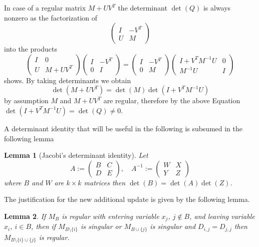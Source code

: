 \documentclass[a4paper]{article}
\newtheorem{lemma}{Lemma}
\begin{document}
In case of a regular matrix $M+UV^{T}$ the determinant $\det(Q)$ is
always nonzero as the factorization of 
\begin{equation*}
\left(
\begin{array}{cc}
I & -V^{T} \\
U & M
\end{array}
\right)
\end{equation*}
into the products 
\begin{equation*}
\left(
\begin{array}{cc}
I & 0 \\
U & M + UV^{T}
\end{array}
\right)
\left(
\begin{array}{cc}
I & -V^{T} \\
0 & I
\end{array}
\right)
=
\left(
\begin{array}{cc}
I & -V^{T}  \\
0 & M
\end{array}
\right)
\left(
\begin{array}{cc}
I + V^{T}M^{-1}U & 0 \\
M^{-1}U          & I
\end{array}
\right)
\end{equation*}
shows.
By taking determinants we obtain
\begin{equation}
\label{eq:det_prod}
\det\left(M + UV^{T}\right) =
\det\left(M\right) \det\left(I + V^{T}M^{-1}U\right)
\end{equation}
by assumption $M$ and $M+UV^{T}$ are regular, therefore by the above
Equation
$\det(I + V^{T}M^{-1}U)=\det(Q) \neq 0$.

A determinant identity that will be useful in the following is subsumed in the
following lemma
\begin{lemma}[Jacobi's determinant identity]
\label{lem:Jacobi_det_id}
Let
\begin{equation}
A:=
\left(
\begin{array}{c|c}
B & C \\
\hline
D & E
\end{array}
\right)
, \quad
A^{-1}:=
\left(
\begin{array}{c|c}
W & X \\
\hline
Y & Z
\end{array}
\right)
\end{equation}
where $B$ and $W$ are $k \times k$ matrices then $\det(B)=\det(A)\det(Z)$.
\end{lemma}
The justification for the new additional update is given by the following
lemma.
\begin{lemma}
\label{lem:main}
If $M_{B}$ is regular with entering variable $x_{j}$, $j \not \in B$, and
leaving variable $x_{i}$, $i \in B$, then if $M_{B \setminus \{i\}}$ 
is singular or $M_{B \cup \{j\}}$ is
singular and $D_{i,j}=D_{j,j}$
then $M_{B \setminus \{i\} \cup \{j\}}$ is regular.
\end{lemma}
\end{document}
